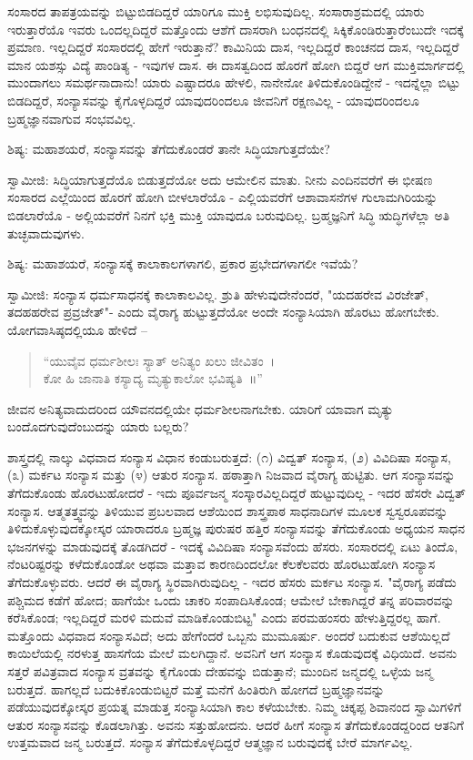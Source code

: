 ಸಂಸಾರದ ತಾಪತ್ರಯವನ್ನು ಬಿಟ್ಟುಬಿಡದಿದ್ದರೆ ಯಾರಿಗೂ ಮುಕ್ತಿ ಲಭಿಸುವುದಿಲ್ಲ. ಸಂಸಾರಾಶ್ರಮದಲ್ಲಿ ಯಾರು ಇರುತ್ತಾರೆಯೊ ಇವರು ಒಂದಲ್ಲದಿದ್ದರೆ ಮತ್ತೊಂದು ಆಶೆಗೆ ದಾಸರಾಗಿ ಬಂಧನದಲ್ಲಿ ಸಿಕ್ಕಿಕೊಂಡಿರುತ್ತಾರೆಂಬುದೇ ಇದಕ್ಕೆ ಪ್ರಮಾಣ. ಇಲ್ಲದಿದ್ದರೆ ಸಂಸಾರದಲ್ಲಿ ಹೇಗೆ ಇರುತ್ತಾನೆ? ಕಾಮಿನಿಯ ದಾಸ, ಇಲ್ಲದಿದ್ದರೆ ಕಾಂಚನದ ದಾಸ, ಇಲ್ಲದಿದ್ದರೆ ಮಾನ ಯಶಸ್ಸು ವಿದ್ಯೆ ಪಾಂಡಿತ್ಯ - ಇವುಗಳ ದಾಸ. ಈ ದಾಸತ್ವದಿಂದ ಹೊರಗೆ ಹೋಗಿ ಬಿದ್ದರೆ ಆಗ ಮುಕ್ತಿಮಾರ್ಗದಲ್ಲಿ ಮುಂದಾಗಲು ಸಮರ್ಥನಾದಾನು! ಯಾರು ಎಷ್ಟಾದರೂ ಹೇಳಲಿ, ನಾನೇನೋ ತಿಳಿದುಕೊಂಡಿದ್ದೇನೆ - ಇದನ್ನೆಲ್ಲಾ ಬಿಟ್ಟು ಬಿಡದಿದ್ದರೆ, ಸಂನ್ಯಾಸವನ್ನು ಕೈಗೊಳ್ಳದಿದ್ದರೆ ಯಾವುದರಿಂದಲೂ ಜೀವನಿಗೆ ರಕ್ಷಣವಿಲ್ಲ - ಯಾವುದರಿಂದಲೂ ಬ್ರಹ್ಮಜ್ಞಾನವಾಗುವ ಸಂಭವವಿಲ್ಲ.

ಶಿಷ್ಯ: ಮಹಾಶಯರೆ, ಸಂನ್ಯಾಸವನ್ನು ತೆಗೆದುಕೊಂಡರೆ ತಾನೇ ಸಿದ್ಧಿಯಾಗುತ್ತದೆಯೇ?

ಸ್ವಾಮೀಜಿ: ಸಿದ್ಧಿಯಾಗುತ್ತದೆಯೊ ಬಿಡುತ್ತದೆಯೋ ಅದು ಆಮೇಲಿನ ಮಾತು. ನೀನು ಎಂದಿನವರೆಗೆ ಈ ಭೀಷಣ ಸಂಸಾರದ ಎಲ್ಲೆಯಿಂದ ಹೊರಗೆ ಹೋಗಿ ಬೀಳಲಾರೆಯೊ - ಎಲ್ಲಿಯವರೆಗೆ ಆಶಾವಾಸನೆಗಳ ಗುಲಾಮಗಿರಿಯನ್ನು ಬಿಡಲಾರೆಯೊ - ಅಲ್ಲಿಯವರೆಗೆ ನಿನಗೆ ಭಕ್ತಿ ಮುಕ್ತಿ ಯಾವುದೂ ಬರುವುದಿಲ್ಲ. ಬ್ರಹ್ಮಜ್ಞನಿಗೆ ಸಿದ್ಧಿ ಋದ್ಧಿಗಳೆಲ್ಲಾ ಅತಿ ತುಚ್ಛವಾದುವುಗಳು.

ಶಿಷ್ಯ: ಮಹಾಶಯರೆ, ಸಂನ್ಯಾಸಕ್ಕೆ ಕಾಲಾಕಾಲಗಳಾಗಲಿ, ಪ್ರಕಾರ ಪ್ರಭೇದಗಳಾಗಲೀ ಇವೆಯೆ?

ಸ್ವಾಮೀಜಿ: ಸಂನ್ಯಾಸ ಧರ್ಮಸಾಧನಕ್ಕೆ ಕಾಲಾಕಾಲವಿಲ್ಲ. ಶ್ರುತಿ ಹೇಳುವುದೇನೆಂದರೆ, "ಯದಹರೇವ ವಿರಜೇತ್, ತದಹಹರೇವ ಪ್ರವ್ರಜೇತ್"- ಎಂದು ವೈರಾಗ್ಯ ಹುಟ್ಟುತ್ತದೆಯೋ ಅಂದೇ ಸಂನ್ಯಾಸಿಯಾಗಿ ಹೊರಟು ಹೋಗಬೇಕು. ಯೋಗವಾಸಿಷ್ಠದಲ್ಲಿಯೂ ಹೇಳಿದೆ –

\begin{verse}
“ಯುವೈವ ಧರ್ಮಶೀಲಃ ಸ್ಯಾತ್ ಅನಿತ್ಯಂ ಖಲು ಜೀವಿತಂ~।\\ಕೋ ಹಿ ಜಾನಾತಿ ಕಸ್ಯಾದ್ಯ ಮೃತ್ಯುಕಾಲೋ ಭವಿಷ್ಯತಿ~॥”
\end{verse}

ಜೀವನ ಅನಿತ್ಯವಾದುದರಿಂದ ಯೌವನದಲ್ಲಿಯೇ ಧರ್ಮಶೀಲನಾಗಬೇಕು. ಯಾರಿಗೆ ಯಾವಾಗ ಮೃತ್ಯು ಬಂದೊದಗುವುದೆಂಬುದನ್ನು ಯಾರು ಬಲ್ಲರು?

ಶಾಸ್ತ್ರದಲ್ಲಿ ನಾಲ್ಕು ವಿಧವಾದ ಸಂನ್ಯಾಸ ವಿಧಾನ ಕಂಡುಬರುತ್ತದೆ: (೧) ವಿದ್ವತ್ ಸಂನ್ಯಾಸ, (೨) ವಿವಿದಿಷಾ ಸಂನ್ಯಾಸ, (೩) ಮರ್ಕಟ ಸಂನ್ಯಾಸ ಮತ್ತು (೪) ಆತುರ ಸಂನ್ಯಾಸ. ಹಠಾತ್ತಾಗಿ ನಿಜವಾದ ವೈರಾಗ್ಯ ಹುಟ್ಟಿತು. ಆಗ ಸಂನ್ಯಾಸವನ್ನು ತೆಗೆದುಕೊಂಡು ಹೊರಟುಹೋದರೆ - ಇದು ಪೂರ್ವಜನ್ಮ ಸಂಸ್ಕಾರವಿಲ್ಲದಿದ್ದರೆ ಹುಟ್ಟುವುದಿಲ್ಲ - ಇದರ ಹೆಸರೇ ವಿದ್ವತ್ ಸಂನ್ಯಾಸ. ಆತ್ಮತತ್ತ್ವವನ್ನು ತಿಳಿಯುವ ಪ್ರಬಲವಾದ ಆಶೆಯಿಂದ ಶಾಸ್ತ್ರಪಾಠ ಸಾಧನಾದಿಗಳ ಮೂಲಕ ಸ್ವಸ್ವರೂಪವನ್ನು ತಿಳಿದುಕೊಳ್ಳುವುದಕ್ಕೋಸ್ಕರ ಯಾರಾದರೂ ಬ್ರಹ್ಮಜ್ಞ ಪುರುಷರ ಹತ್ತಿರ ಸಂನ್ಯಾಸವನ್ನು ತೆಗೆದುಕೊಂಡು ಅಧ್ಯಯನ ಸಾಧನ ಭಜನಗಳನ್ನು ಮಾಡುವುದಕ್ಕೆ ತೊಡಗಿದರೆ - ಇದಕ್ಕೆ ವಿವಿದಿಷಾ ಸಂನ್ಯಾಸವೆಂದು ಹೆಸರು. ಸಂಸಾರದಲ್ಲಿ ಏಟು ತಿಂದೊ, ನೆಂಟರಿಷ್ಟರನ್ನು ಕಳೆದುಕೊಂಡೋ ಅಥವಾ ಮತ್ತಾವ ಕಾರಣದಿಂದಲೋ ಕೆಲಕೆಲವರು ಹೊರಟುಹೋಗಿ ಸಂನ್ಯಾಸ ತೆಗೆದುಕೊಳ್ಳುವರು. ಆದರೆ ಈ ವೈರಾಗ್ಯ ಸ್ಥಿರವಾಗಿರುವುದಿಲ್ಲ - ಇದರ ಹೆಸರು ಮರ್ಕಟ ಸಂನ್ಯಾಸ. "ವೈರಾಗ್ಯ ಪಡೆದು ಪಶ್ಚಿಮದ ಕಡೆಗೆ ಹೋದ; ಹಾಗೆಯೇ ಒಂದು ಚಾಕರಿ ಸಂಪಾದಿಸಿಕೊಂಡ; ಆಮೇಲೆ ಬೇಕಾಗಿದ್ದರೆ ತನ್ನ ಪರಿವಾರವನ್ನು ಕರೆಸಿಕೊಂಡ; ಇಲ್ಲದಿದ್ದರೆ ಮರಳಿ ಮದುವೆ ಮಾಡಿಕೊಂಡುಬಿಟ್ಟ" ಎಂದು ಪರಮಹಂಸರು ಹೇಳುತ್ತಿದ್ದರಲ್ಲ ಹಾಗೆ. ಮತ್ತೊಂದು ವಿಧವಾದ ಸಂನ್ಯಾಸವಿದೆ; ಅದು ಹೇಗೆಂದರೆ ಒಬ್ಬನು ಮುಮೂರ್ಷು. ಅಂದರೆ ಬದುಕುವ ಆಶೆಯಿಲ್ಲದೆ ಕಾಯಿಲೆಯಲ್ಲಿ ನರಳುತ್ತ ಹಾಸಗೆಯ ಮೇಲೆ ಮಲಗಿದ್ದಾನೆ. ಅವನಿಗೆ ಆಗ ಸಂನ್ಯಾಸ ಕೊಡುವುದಕ್ಕೆ ವಿಧಿಯಿದೆ. ಅವನು ಸತ್ತರೆ ಪವಿತ್ರವಾದ ಸಂನ್ಯಾಸ ವ್ರತವನ್ನು ಕೈಗೊಂಡು ದೇಹವನ್ನು ಬಿಡುತ್ತಾನೆ; ಮುಂದಿನ ಜನ್ಮದಲ್ಲಿ ಒಳ್ಳೆಯ ಜನ್ಮ ಬರುತ್ತದೆ. ಹಾಗಲ್ಲದೆ ಬದುಕಿಕೊಂಡುಬಿಟ್ಟರೆ ಮತ್ತೆ ಮನೆಗೆ ಹಿಂತಿರುಗಿ ಹೋಗದೆ ಬ್ರಹ್ಮಜ್ಞಾನವನ್ನು ಪಡೆಯುವುದಕ್ಕೋಸ್ಕರ ಪ್ರಯತ್ನ ಮಾಡುತ್ತ ಸಂನ್ಯಾಸಿಯಾಗಿ ಕಾಲ ಕಳೆಯಬೇಕು. ನಿಮ್ಮ ಚಿಕ್ಕಪ್ಪ ಶಿವಾನಂದ ಸ್ವಾಮಿಗಳಿಗೆ ಆತುರ ಸಂನ್ಯಾಸವನ್ನು ಕೊಡಲಾಗಿತ್ತು. ಅವನು ಸತ್ತುಹೋದನು. ಆದರೆ ಹೀಗೆ ಸಂನ್ಯಾಸ ತೆಗೆದುಕೊಂಡದ್ದರಿಂದ ಆತನಿಗೆ ಉತ್ತಮವಾದ ಜನ್ಮ ಬರುತ್ತದೆ. ಸಂನ್ಯಾಸ ತೆಗೆದುಕೊಳ್ಳದಿದ್ದರೆ ಆತ್ಮಜ್ಞಾನ ಬರುವುದಕ್ಕೆ ಬೇರೆ ಮಾರ್ಗವಿಲ್ಲ.


